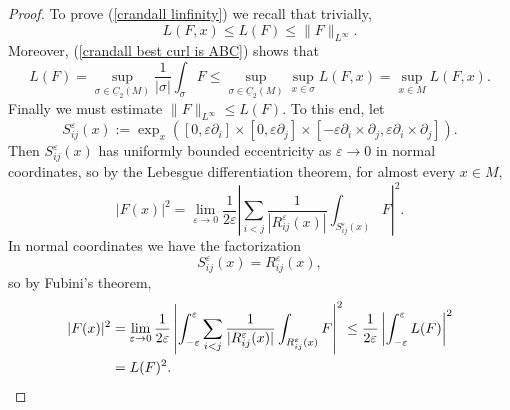 \documentclass[reqno,11pt]{amsart}
\newcommand{\Chain}{\underline C}
\theoremstyle{definition}
\numberwithin{equation}{section}
\begin{document}
\begin{proof}
To prove (\ref{crandall linfinity}) we recall that trivially,
$$L(F, x) \leq L(F) \leq \|F\|_{L^\infty}.$$
Moreover, (\ref{crandall best curl is ABC}) shows that
$$L(F) = \sup_{\sigma \in \Chain_2(M)} \frac{1}{|\sigma|} \int_\sigma F \leq \sup_{\sigma \in \Chain_2(M)} \sup_{x \in \sigma} L(F, x) = \sup_{x \in M} L(F, x).$$
Finally we must estimate $\|F\|_{L^\infty} \leq L(F)$.
To this end, let
$$S_{ij}^\varepsilon(x) := \exp_x([0, \varepsilon \partial_i] \times [0, \varepsilon \partial_j] \times [-\varepsilon \partial_i \times \partial_j, \varepsilon \partial_i \times \partial_j]).$$
Then $S_{ij}^\varepsilon(x)$ has uniformly bounded eccentricity as $\varepsilon \to 0$ in normal coordinates, so by the Lebesgue differentiation theorem, for almost every $x \in M$,
$$|F(x)|^2 = \lim_{\varepsilon \to 0} \frac{1}{2\varepsilon} \left|\sum_{i < j} \frac{1}{|R_{ij}^\varepsilon(x)|} \int_{S_{ij}^\varepsilon(x)} F\right|^2.$$
In normal coordinates we have the factorization 
$$S_{ij}^\varepsilon(x) = R_{ij}^\varepsilon(x),$$
so by Fubini's theorem, 
\begin{align*}
|F(x)|^2 
&= \lim_{\varepsilon \to 0} \frac{1}{2\varepsilon} \left|\int_{-\varepsilon}^\varepsilon \sum_{i < j} \frac{1}{|R_{ij}^\varepsilon(x)|} \int_{R_{ij}^\varepsilon(x)} F\right|^2 \leq \frac{1}{2\varepsilon} \left|\int_{-\varepsilon}^\varepsilon L(F)\right|^2 \\
& = L(F)^2. \qedhere
\end{align*}
\end{proof}
\end{document}
